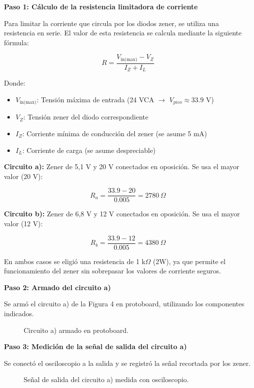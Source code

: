 \textbf{Paso 1: Cálculo de la resistencia limitadora de corriente}

Para limitar la corriente que circula por los diodos zener, se utiliza una resistencia en serie. El valor de esta resistencia se calcula mediante la siguiente fórmula:

\[
R = \frac{V_{\text{in(max)}} - V_Z}{I_Z + I_L}
\]

Donde:
\begin{itemize}
    \item \( V_{\text{in(max)}} \): Tensión máxima de entrada (24 VCA $\rightarrow$ $V_{pico} \approx 33.9$ V)
    \item \( V_Z \): Tensión zener del diodo correspondiente
    \item \( I_Z \): Corriente mínima de conducción del zener (se asume 5 mA)
    \item \( I_L \): Corriente de carga (se asume despreciable)
\end{itemize}

\textbf{Circuito a):}  
Zener de 5,1 V y 20 V conectados en oposición. Se usa el mayor valor (20 V):

\[
R_a = \frac{33.9 - 20}{0.005} = 2780\ \Omega
\]

\textbf{Circuito b):}  
Zener de 6,8 V y 12 V conectados en oposición. Se usa el mayor valor (12 V):

\[
R_b = \frac{33.9 - 12}{0.005} = 4380\ \Omega
\]

En ambos casos se eligió una resistencia de 1 k$\Omega$ (2W), ya que permite el funcionamiento del zener sin sobrepasar los valores de corriente seguros.

\textbf{Paso 2: Armado del circuito a)}

Se armó el circuito a) de la Figura 4 en protoboard, utilizando los componentes indicados.

\begin{figure}[H]
    \centering
    \caption{Circuito a) armado en protoboard.}
\end{figure}

\textbf{Paso 3: Medición de la señal de salida del circuito a)}

Se conectó el osciloscopio a la salida y se registró la señal recortada por los zener.

\begin{figure}[H]
    \centering
    \caption{Señal de salida del circuito a) medida con osciloscopio.}
\end{figure}

